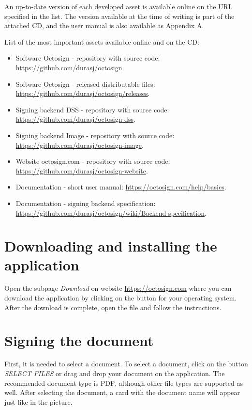 \documentclass[thesismargins, english, thesislinespacing, onelinechapterstyle, upjsfrontpage]{rnthesis}
\begin{document}
\prilohy
An up-to-date version of each developed asset is available online on the URL specified in the list.
The version available at the time of writing is part of the attached CD, and the user manual is also available as Appendix A.

List of the most important assets available online and on the CD:

\begin{itemize}
  \item Software Octosign - repository with source code: \url{https://github.com/durasj/octosign}.
  \item Software Octosign - released distributable files: \url{https://github.com/durasj/octosign/releases}.
  \item Signing backend DSS - repository with source code: \url{https://github.com/durasj/octosign-dss}.
  \item Signing backend Image - repository with source code: \url{https://github.com/durasj/octosign-image}.
  \item Website octosign.com - repository with source code: \url{https://github.com/durasj/octosign-website}.
  \item Documentation - short user manual: \url{https://octosign.com/help/basics}.
  \item Documentation - signing backend specification: \url{https://github.com/durasj/octosign/wiki/Backend-specification}.
\end{itemize}


\section{Downloading and installing the application}

Open the subpage \textit{Download} on website \url{https://octosign.com} where you can download the application by clicking on the button for your operating system.
After the download is complete, open the file and follow the instructions.

\section{Signing the document}

First, it is needed to select a document. To select a document, click on the button \textit{SELECT FILES} or drag and drop your document on the application.
The recommended document type is PDF, although other file types are supported as well.
After selecting the document, a card with the document name will appear just like in the picture.
\end{document}
